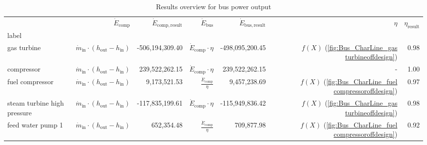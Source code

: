 \documentclass[]{article}
\begin{document}
\begin{table}[H]
\centering
\caption{Results overview for bus power output}
\begin{tabular}{lrrrrrr}
\toprule
{} &                                                   $\dot{E}_\mathrm{comp}$ & $\dot{E}_\mathrm{comp,result}$ &                $\dot{E}_\mathrm{bus}$ & $\dot{E}_\mathrm{bus,result}$ &                                                               $\eta$ & $\eta_\mathrm{result}$ \\
label                       &                                                                           &                                &                                       &                               &                                                                      &                        \\
\midrule
gas turbine                 &  $\dot{m}_\mathrm{in} \cdot \left(h_\mathrm{out} - h_\mathrm{in} \right)$ &                -506,194,309.40 &    $\dot{E}_\mathrm{comp} \cdot \eta$ &               -498,095,200.45 &      $f\left(X\right)$ (\ref{fig:Bus_CharLine_gas turbineoffdesign}) &                   0.98 \\
compressor                  &  $\dot{m}_\mathrm{in} \cdot \left(h_\mathrm{out} - h_\mathrm{in} \right)$ &                 239,522,262.15 &    $\dot{E}_\mathrm{comp} \cdot \eta$ &                239,522,262.15 &                                                                    - &                   1.00 \\
fuel compressor             &  $\dot{m}_\mathrm{in} \cdot \left(h_\mathrm{out} - h_\mathrm{in} \right)$ &                   9,173,521.53 &  $\frac{\dot{E}_\mathrm{comp}}{\eta}$ &                  9,457,238.69 &  $f\left(X\right)$ (\ref{fig:Bus_CharLine_fuel compressoroffdesign}) &                   0.97 \\
steam turbine high pressure &  $\dot{m}_\mathrm{in} \cdot \left(h_\mathrm{out} - h_\mathrm{in} \right)$ &                -117,835,199.61 &    $\dot{E}_\mathrm{comp} \cdot \eta$ &               -115,949,836.42 &      $f\left(X\right)$ (\ref{fig:Bus_CharLine_gas turbineoffdesign}) &                   0.98 \\
feed water pump 1           &  $\dot{m}_\mathrm{in} \cdot \left(h_\mathrm{out} - h_\mathrm{in} \right)$ &                     652,354.48 &  $\frac{\dot{E}_\mathrm{comp}}{\eta}$ &                    709,877.98 &  $f\left(X\right)$ (\ref{fig:Bus_CharLine_fuel compressoroffdesign}) &                   0.92 \\

\end{tabular}
\end{table}
\end{document}
